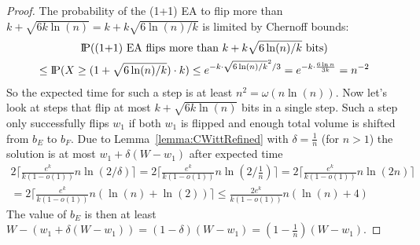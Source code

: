 \begin{proof}




    The probability of the (1+1) EA to flip more than $k+\sqrt{6k\ln(n)}=k+k\sqrt{6\ln(n)/k}$ is limited by Chernoff bounds:
    \begin{gather}
        \nonumber \text{I\kern-0.15em P}(\text{(1+1) EA flips more than }k+k\sqrt{6\ln(n)/k}\text{ bits})\\ \nonumber
        \le\text{I\kern-0.15em P}(X\ge (1+\sqrt{6\ln(n)/k})\cdot k)
        \le e^{-k\cdot{\sqrt{6\ln(n)/k}}^2/3}
        = e^{-k\cdot \frac{6\ln n}{3k}}
        = n^{-2}
    \end{gather}
    So the expected time for such a step is at least \(n^2=\omega(n\ln(n))\).
    Now let's look at steps that flip at most $k+\sqrt{6k\ln(n)}$ bits in a single step.
    Such a step only successfully flips $w_1$ if both $w_1$ is flipped and enough total volume is shifted from $b_E$ to $b_F$.
    Due to Lemma~\ref{lemma:CWittRefined} with $\delta=\frac{1}{n}$ (for $n>1$) the solution is at most $w_1+\delta(W-w_1)$ after expected time
    \begin{gather}\nonumber
        2\lceil\frac{e^k}{k(1-o(1))}n\ln(2/\delta)\rceil
        =2\lceil\frac{e^k}{k(1-o(1))}n\ln(2/\frac{1}{n})\rceil
        =2\lceil\frac{e^k}{k(1-o(1))}n\ln(2n)\rceil \\ \nonumber
        =2\lceil\frac{e^k}{k(1-o(1))}n(\ln(n)+\ln(2))\rceil
        \le\frac{2e^k}{k(1-o(1))}n(\ln(n)+4)
    \end{gather}
    The value of $b_E$ is then at least \(W-(w_1+\delta(W-w_1))=(1-\delta)(W-w_1)=(1-\frac{1}{n})(W-w_1)\).


\end{proof}
